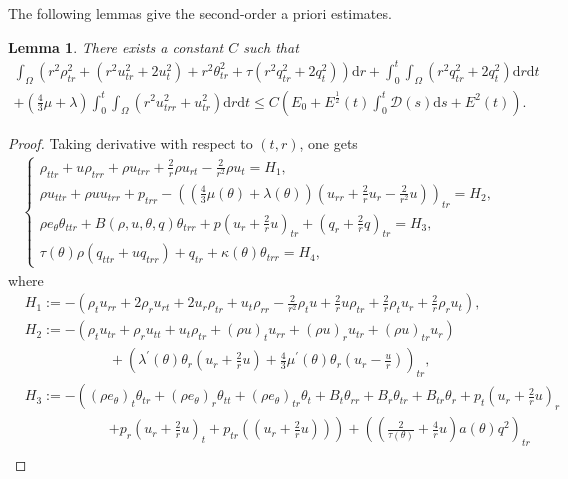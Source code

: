 \documentclass[11pt,reqno]{amsart}
\numberwithin{equation}{section}
\newtheorem{lemma}[theorem]{Lemma}
\newcommand{\dif}{\mathrm{d}}
\newcommand{\intx}{\int_0^t \int_{\Omega} }
\begin{document}
The following lemmas give the second-order a priori estimates.

 \begin{lemma}\label{le6}
 There exists a constant $C$ such that
 \begin{align}
 \int_{\Omega} \left( r^2 \rho_{tr}^2+(r^2 u_{tr}^2+2u_t^2)+r^2 \theta_{tr}^2 +\tau( r^2 q_{tr}^2+2q_t^2) \right) \dif r + \intx (r^2q_{tr}^2+2q_t^2)\dif r \dif t \nonumber\\
 +\left(\frac{4}{3} \mu+\lambda\right) \intx (r^2 u_{trr}^2+u_{tr}^2) \dif r \dif t\le C(E_0+E^\frac{1}{2}(t) \int_0^t  \mathcal D(s)\dif s+E^2(t)). \label{1.40}
 \end{align}
 \end{lemma}

 \begin{proof}
 Taking derivative with respect to $(t,r)$, one gets
 \begin{align}\label{1.41}
 \begin{cases}
 \rho_{ttr}+u \rho_{trr} +\rho u_{trr}+\frac{2}{r} \rho u_{rt}-\frac{2}{r^2} \rho u_t=H_1,\\
 \rho u_{ttr} +\rho u u_{trr}+p_{trr}-\left(\left(\frac{4}{3} \mu(\theta)+\lambda(\theta)\right)\left(u_{rr}+\frac{2}{r}u_r-\frac{2}{r^2} u\right)\right)_{tr}=H_2,\\
 \rho e_\theta \theta_{ttr}+ B(\rho, u, \theta, q) \theta_{trr}+p\left(u_r+\frac{2}{r} u\right)_{tr}+\left(q_r+\frac{2}{r} q\right)_{tr}=H_3,\\
 \tau(\theta) \rho (q_{ttr}+ u q_{trr})+q_{tr}+\kappa(\theta) \theta_{trr}=H_4,
 \end{cases}
 \end{align}
 where
 \begin{align*}
 &H_1:=-\left( \rho_t u_{rr}+2 \rho_r u_{rt}+2 u_r \rho_{tr}+u_t \rho_{rr}-\frac{2}{r^2}\rho_t u+\frac{2}{r} u\rho_{tr}+\frac{2}{r} \rho_t u_r+\frac{2}{r} \rho_r u_t\right),\\
& H_2:=-\left( \rho_t u_{tr}+\rho_r u_{tt}+u_t \rho_{tr}+(\rho u)_t u_{rr}+(\rho u)_r u_{tr}+(\rho u)_{tr} u_r\right)\\
&\qquad \qquad \qquad+\left(\lambda^\prime(\theta)\theta_r\left(u_r+\frac{2}{r}u\right)+\frac{4}{3}\mu^\prime(\theta) \theta_r\left(u_r-\frac{u}{r}\right)\right)_{tr},\\
 &H_3:=-\left((\rho e_\theta)_t \theta_{tr}+(\rho e_\theta)_r \theta_{tt}+(\rho e_\theta)_{tr}\theta_t+B_t \theta_{rr}+B_r \theta_{tr}+B_{tr}\theta_r+p_t(u_r+\frac{2}{r}u)_r\right.\\
 &\qquad \qquad \qquad\left.+p_r(u_r+\frac{2}{r} u)_t+p_{tr} \left((u_r+\frac{2}{r} u)\right)\right)+\left(\left(\frac{2}{\tau(\theta)}+\frac{4}{r} u\right) a(\theta) q^2\right)_{tr}\\

\end{align*}
\end{proof}
\end{document}
